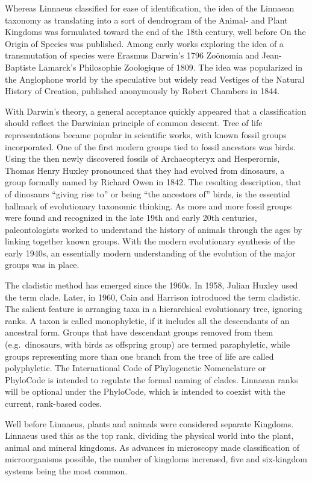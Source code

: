 \documentclass[]{book}
\theoremstyle{definition}
\theoremstyle{definition}
\theoremstyle{definition}
\theoremstyle{remark}
\begin{document}
Whereas Linnaeus classified for ease of identification, the idea of the
Linnaean taxonomy as translating into a sort of dendrogram of the
Animal- and Plant Kingdoms was formulated toward the end of the 18th
century, well before On the Origin of Species was published. Among early
works exploring the idea of a transmutation of species were Erasmus
Darwin's 1796 Zoönomia and Jean-Baptiste Lamarck's Philosophie
Zoologique of 1809. The idea was popularized in the Anglophone world by
the speculative but widely read Vestiges of the Natural History of
Creation, published anonymously by Robert Chambers in 1844.

With Darwin's theory, a general acceptance quickly appeared that a
classification should reflect the Darwinian principle of common descent.
Tree of life representations became popular in scientific works, with
known fossil groups incorporated. One of the first modern groups tied to
fossil ancestors was birds. Using the then newly discovered fossils of
Archaeopteryx and Hesperornis, Thomas Henry Huxley pronounced that they
had evolved from dinosaurs, a group formally named by Richard Owen in
1842. The resulting description, that of dinosaurs ``giving rise to'' or
being ``the ancestors of'' birds, is the essential hallmark of
evolutionary taxonomic thinking. As more and more fossil groups were
found and recognized in the late 19th and early 20th centuries,
paleontologists worked to understand the history of animals through the
ages by linking together known groups. With the modern evolutionary
synthesis of the early 1940s, an essentially modern understanding of the
evolution of the major groups was in place.

The cladistic method has emerged since the 1960s. In 1958, Julian Huxley
used the term clade. Later, in 1960, Cain and Harrison introduced the
term cladistic. The salient feature is arranging taxa in a hierarchical
evolutionary tree, ignoring ranks. A taxon is called monophyletic, if it
includes all the descendants of an ancestral form. Groups that have
descendant groups removed from them (e.g.~dinosaurs, with birds as
offspring group) are termed paraphyletic, while groups representing more
than one branch from the tree of life are called polyphyletic. The
International Code of Phylogenetic Nomenclature or PhyloCode is intended
to regulate the formal naming of clades. Linnaean ranks will be optional
under the PhyloCode, which is intended to coexist with the current,
rank-based codes.

Well before Linnaeus, plants and animals were considered separate
Kingdoms. Linnaeus used this as the top rank, dividing the physical
world into the plant, animal and mineral kingdoms. As advances in
microscopy made classification of microorganisms possible, the number of
kingdoms increased, five and six-kingdom systems being the most common.
\end{document}
